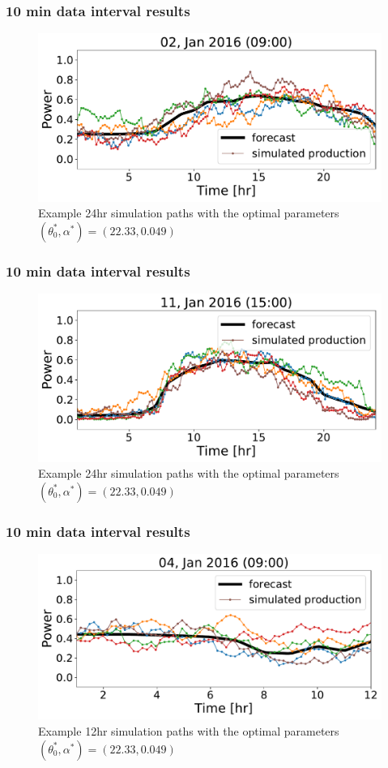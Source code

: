 \documentclass[aspectratio=169]{beamer}\usepackage[utf8]{inputenc}
\begin{document}
\begin{frame}\frametitle{ 10 min data interval results  }
\begin{figure} %
\begin{center}
\includegraphics[width=0.8\linewidth]{plots_SGD/0.pdf}
\end{center}
   \caption{ Example 24hr simulation paths with the optimal parameters $(\theta_0^*, \alpha^*) = (22.33,  0.049)$}
\label{100samples}
\end{figure}
\end{frame}
\begin{frame}\frametitle{ 10 min data interval results  }
\begin{figure} %
\begin{center}
\includegraphics[width=0.8\linewidth]{plots_SGD/18.pdf}
\end{center}
   \caption{ Example 24hr simulation paths with the optimal parameters $(\theta_0^*, \alpha^*) = (22.33,  0.049)$}
\label{100samples}
\end{figure}
\end{frame}
\begin{frame}\frametitle{ 10 min data interval results  }
\begin{figure} %
\begin{center}
\includegraphics[width=0.8\linewidth]{plots_SGD/4.pdf}
\end{center}
   \caption{ Example 12hr simulation paths with the optimal parameters $(\theta_0^*, \alpha^*) = (22.33,  0.049)$}
\label{100samples}
\end{figure}
\end{frame}
\end{document}
